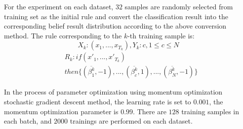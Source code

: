 \documentclass{ieeeaccess}
\begin{document}
For the experiment on each dataset, $32$ samples are randomly selected from training set as the initial rule
and convert the classification result into the corresponding belief result distribution according to the above conversion method.
The rule corresponding to the $k$-th training sample is:
\begin{equation}
    X_k:(x_1,...,x_{T_k}),Y_k:c,1\leq c\leq N
\end{equation}
\begin{equation}
    \begin{split}
        &R_k:if(x'_1,...,x'_{T_k})\\
        &then\{(\overline{\beta_1^k},-1),...,(\overline{\beta_c^k},1),...,(\overline{\beta_N^k},-1)\}
    \end{split}
\end{equation}

In the process of parameter optimization using momentum optimization stochastic gradient descent method,
the learning rate is set to $0.001$, the momentum optimization parameter is $0.99$.
There are $128$ training samples in each batch, and $2000$ trainings are performed on each dataset.
\end{document}
